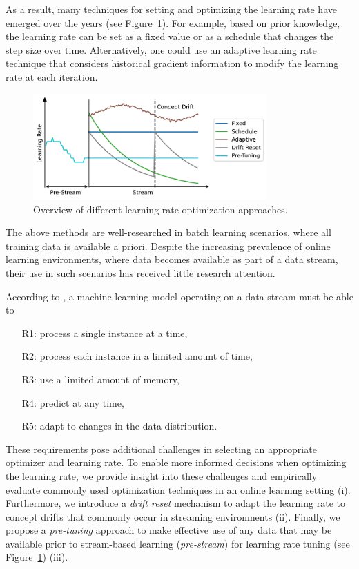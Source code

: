 \documentclass{article} %
\begin{document}
As a result, many techniques for setting and optimizing the learning rate have emerged over the years (see Figure~\ref{fig:lr_overview}).
For example, based on prior knowledge, the learning rate can be set as a fixed value or as a schedule that changes the step size over time.
Alternatively, one could use an adaptive learning rate technique that considers historical gradient information to modify the learning rate at each iteration.
\begin{figure}[b]
   \centering
   \includegraphics[width=0.8\textwidth]{figures/lr_overview.pdf}
   \caption{Overview of different learning rate optimization approaches.}
   \label{fig:lr_overview}
\end{figure}
The above methods are well-researched in batch learning scenarios, where all training data is available a priori.
Despite the increasing prevalence of online learning environments, where data becomes available as part of a data stream, their use in such scenarios has received little research attention.

According to \citet{bifetMOAMassiveOnline2010}, a machine learning model operating on a data stream must be able to
\begin{enumerate}
   \item[R1:] process a single instance at a time,\label{rq:single_instance}
   \item[R2:] process each instance in a limited amount of time,\label{rq:limited_time}
   \item[R3:] use a limited amount of memory,\label{rq:limited_memory}
   \item[R4:] predict at any time,\label{rq:predict_any_time}
   \item[R5:] adapt to changes in the data distribution.\label{rq:adapt_to_drift}
\end{enumerate}

These requirements pose additional challenges in selecting an appropriate optimizer and learning rate.
To enable more informed decisions when optimizing the learning rate, we provide insight into these challenges and empirically evaluate commonly used optimization techniques in an online learning setting (i).
Furthermore, we introduce a \textit{drift reset} mechanism to adapt the learning rate to concept drifts that commonly occur in streaming environments (ii).
Finally, we propose a \textit{pre-tuning} approach to make effective use of any data that may be available prior to stream-based learning (\textit{pre-stream}) for learning rate tuning (see Figure~\ref{fig:lr_overview}) (iii).
\end{document}
